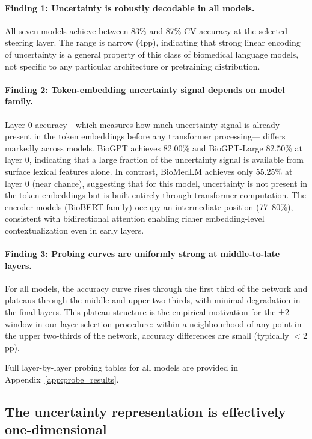 \documentclass[11pt,a4paper]{article}
\begin{document}
\paragraph{Finding 1: Uncertainty is robustly decodable in all models.}
All seven models achieve between 83\% and 87\% CV accuracy at the
selected steering layer. The range is narrow (4pp), indicating that
strong linear encoding of uncertainty is a general property of this
class of biomedical language models, not specific to any particular
architecture or pretraining distribution.

\paragraph{Finding 2: Token-embedding uncertainty signal depends on model family.}
Layer 0 accuracy---which measures how much uncertainty signal is already
present in the token embeddings before any transformer processing---
differs markedly across models. BioGPT achieves 82.00\% and BioGPT-Large
82.50\% at layer 0, indicating that a large fraction of the uncertainty
signal is available from surface lexical features alone. In contrast,
BioMedLM achieves only 55.25\% at layer 0 (near chance), suggesting that
for this model, uncertainty is not present in the token embeddings but is
built entirely through transformer computation. The encoder models
(BioBERT family) occupy an intermediate position (77--80\%), consistent
with bidirectional attention enabling richer embedding-level
contextualization even in early layers.

\paragraph{Finding 3: Probing curves are uniformly strong at middle-to-late layers.}
For all models, the accuracy curve rises through the first third of the
network and plateaus through the middle and upper two-thirds, with
minimal degradation in the final layers. This plateau structure is the
empirical motivation for the ±2 window in our layer selection procedure:
within a neighbourhood of any point in the upper two-thirds of the
network, accuracy differences are small (typically $<2$pp).

Full layer-by-layer probing tables for all models are provided in
Appendix~\ref{app:probe_results}.

\subsection{The uncertainty representation is effectively one-dimensional}
\end{document}
